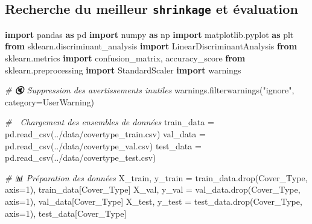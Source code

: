 \documentclass[
]{article}
\newenvironment{Shaded}{}{}
\newcommand{\CommentTok}[1]{\textcolor[rgb]{0.38,0.63,0.69}{\textit{#1}}}
\newcommand{\DecValTok}[1]{\textcolor[rgb]{0.25,0.63,0.44}{#1}}
\newcommand{\ImportTok}[1]{\textcolor[rgb]{0.00,0.50,0.00}{\textbf{#1}}}
\newcommand{\NormalTok}[1]{#1}
\newcommand{\OperatorTok}[1]{\textcolor[rgb]{0.40,0.40,0.40}{#1}}
\newcommand{\PreprocessorTok}[1]{\textcolor[rgb]{0.74,0.48,0.00}{#1}}
\newcommand{\StringTok}[1]{\textcolor[rgb]{0.25,0.44,0.63}{#1}}
\begin{document}
\subsection{\texorpdfstring{Recherche du meilleur \texttt{shrinkage} et
évaluation}{Recherche du meilleur shrinkage et évaluation}}\label{recherche-du-meilleur-shrinkage-et-uxe9valuation}

\begin{Shaded}
\begin{Highlighting}[]
\ImportTok{import}\NormalTok{ pandas }\ImportTok{as}\NormalTok{ pd}
\ImportTok{import}\NormalTok{ numpy }\ImportTok{as}\NormalTok{ np}
\ImportTok{import}\NormalTok{ matplotlib.pyplot }\ImportTok{as}\NormalTok{ plt}
\ImportTok{from}\NormalTok{ sklearn.discriminant\_analysis }\ImportTok{import}\NormalTok{ LinearDiscriminantAnalysis}
\ImportTok{from}\NormalTok{ sklearn.metrics }\ImportTok{import}\NormalTok{ confusion\_matrix, accuracy\_score}
\ImportTok{from}\NormalTok{ sklearn.preprocessing }\ImportTok{import}\NormalTok{ StandardScaler}
\ImportTok{import}\NormalTok{ warnings}

\CommentTok{\# 🔇 Suppression des avertissements inutiles}
\NormalTok{warnings.filterwarnings(}\StringTok{"ignore"}\NormalTok{, category}\OperatorTok{=}\PreprocessorTok{UserWarning}\NormalTok{)}

\CommentTok{\# 🔄 Chargement des ensembles de données}
\NormalTok{train\_data }\OperatorTok{=}\NormalTok{ pd.read\_csv(}\StringTok{\textquotesingle{}../data/covertype\_train.csv\textquotesingle{}}\NormalTok{)}
\NormalTok{val\_data }\OperatorTok{=}\NormalTok{ pd.read\_csv(}\StringTok{\textquotesingle{}../data/covertype\_val.csv\textquotesingle{}}\NormalTok{)}
\NormalTok{test\_data }\OperatorTok{=}\NormalTok{ pd.read\_csv(}\StringTok{\textquotesingle{}../data/covertype\_test.csv\textquotesingle{}}\NormalTok{)}

\CommentTok{\# 📊 Préparation des données}
\NormalTok{X\_train, y\_train }\OperatorTok{=}\NormalTok{ train\_data.drop(}\StringTok{\textquotesingle{}Cover\_Type\textquotesingle{}}\NormalTok{, axis}\OperatorTok{=}\DecValTok{1}\NormalTok{), train\_data[}\StringTok{\textquotesingle{}Cover\_Type\textquotesingle{}}\NormalTok{]}
\NormalTok{X\_val, y\_val }\OperatorTok{=}\NormalTok{ val\_data.drop(}\StringTok{\textquotesingle{}Cover\_Type\textquotesingle{}}\NormalTok{, axis}\OperatorTok{=}\DecValTok{1}\NormalTok{), val\_data[}\StringTok{\textquotesingle{}Cover\_Type\textquotesingle{}}\NormalTok{]}
\NormalTok{X\_test, y\_test }\OperatorTok{=}\NormalTok{ test\_data.drop(}\StringTok{\textquotesingle{}Cover\_Type\textquotesingle{}}\NormalTok{, axis}\OperatorTok{=}\DecValTok{1}\NormalTok{), test\_data[}\StringTok{\textquotesingle{}Cover\_Type\textquotesingle{}}\NormalTok{]}


\end{Highlighting}
\end{Shaded}
\end{document}

